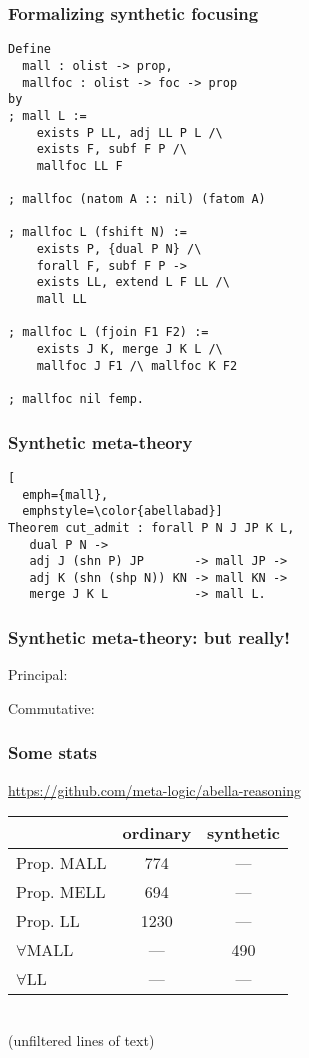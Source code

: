 \documentclass{beamer}
\begin{document}
\begin{frame}[fragile]
  \frametitle{Formalizing synthetic focusing}

  \smaller

\begin{lstlisting}
Define
  mall : olist -> prop,
  mallfoc : olist -> foc -> prop
by
; mall L :=
    exists P LL, adj LL P L /\
    exists F, subf F P /\
    mallfoc LL F

; mallfoc (natom A :: nil) (fatom A)

; mallfoc L (fshift N) :=
    exists P, {dual P N} /\
    forall F, subf F P ->
    exists LL, extend L F LL /\
    mall LL

; mallfoc L (fjoin F1 F2) :=
    exists J K, merge J K L /\
    mallfoc J F1 /\ mallfoc K F2

; mallfoc nil femp.
\end{lstlisting}
\end{frame}

\begin{frame}[fragile]
  \frametitle{Synthetic meta-theory}

  \judg{
    \infer={
      \ts \G, \D
    }{
      \ts \G, \SHN P
      &
      \ts \D, \SHN \SHP \dual P
    }
  }

\begin{lstlisting}[
  emph={mall},
  emphstyle=\color{abellabad}]
Theorem cut_admit : forall P N J JP K L,
   dual P N ->
   adj J (shn P) JP       -> mall JP ->
   adj K (shn (shp N)) KN -> mall KN ->
   merge J K L            -> mall L.
\end{lstlisting}
\end{frame}

\begin{frame}
  \frametitle{Synthetic meta-theory: but really!}

  Principal:
  \judg{
    \infer={
      \ts \G, \D
    }{
      \W \in P
      &
      \ts \G : \foc{\W}
      &
      \ts \D : \foc{\SHP \dual P}
    }
  }

  Commutative:
  \judg{
    \infer={
      \ts \G, \D : [\W]
    }{
      \ts \G, \SHN P : [\W]
      &
      \ts \D : \foc{\SHP \dual P}
    }
  }
\end{frame}

\begin{frame}
  \frametitle{Some stats}

  \centering
  \url{https://github.com/meta-logic/abella-reasoning}

  \vspace{1cm}

  \begin{tabu}{l|c|c}
    & ordinary & synthetic \\\hline
    \vrule width 0pt height 1.3em
    Prop. MALL & \alert{774} & --- \\
    Prop. MELL & 694 & --- \\
    Prop. LL & 1230 & --- \\[1ex]
    $\forall$MALL & --- & \alert{490} \\
    $\forall$LL & --- & ---
  \end{tabu}\\
  {\scriptsize (unfiltered lines of text)}

\end{frame}
\end{document}
